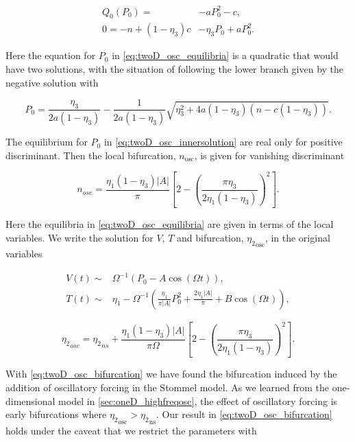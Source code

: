 \begin{equation}\label{eq:twoD_osc_equilibria}
\begin{aligned}
Q_0(P_0)=&-aP_0^2-c,\\
0=-n+(1-\eta_3)c&-\eta_3 P_0+aP_0^2.
\end{aligned}
\end{equation}

Here the equation for $P_0$ in \eqref{eq:twoD_osc_equilibria} is a quadratic that would have two solutions, with the situation of following the lower branch given by the negative solution with

\begin{equation}\label{eq:twoD_osc_innersolution}
P_0=\frac{\eta_3}{2a(1-\eta_3)}- \frac{1}{2a(1-\eta_3)}\sqrt{\eta_3^2+4a(1-\eta_3)(n-c(1-\eta_3))}.
\end{equation}

The equilibrium for $P_0$ in \eqref{eq:twoD_osc_innersolution} are real only for positive discriminant. Then the local bifurcation, $n_{\text{osc}}$, is given for vanishing discriminant 

\begin{equation}\label{eq:twoD_osc_innerbif}
n_{osc} = \frac{\eta_1(1-\eta_3)|A|}{\pi}\left[2-\left(\frac{\pi\eta_3}{2\eta_1(1-\eta_3)}\right)^2\right].
\end{equation}

Here the equilibria in \eqref{eq:twoD_osc_equilibria} are given in terms of the local variables. We write the solution for $V$, $T$ and bifurcation, ${\eta_2}_{\text{osc}}$, in the original variables 

\begin{equation}\label{eq:twoD_osc_innersolnoriginal}
\begin{aligned}
V(t)\sim& \Omega^{-1}\left(P_0-A\cos(\Omega t)\right),\\
T(t)\sim& \eta_1-\Omega^{-1}\left(\frac{\eta_1}{\pi|A|}P_0^2+\frac{2\eta_1|A|}{\pi}+B\cos(\Omega t)\right),
\end{aligned}
\end{equation}

\begin{equation}\label{eq:twoD_osc_bifurcation}
{\eta_2}_{osc} = {\eta_2}_{ns}+\frac{\eta_1(1-\eta_3)|A|}{\pi\Omega}\left[2-\left(\frac{\pi\eta_3}{2\eta_1(1-\eta_3)}\right)^2\right].
\end{equation}

With \eqref{eq:twoD_osc_bifurcation} we have found the bifurcation induced by the addition of oscillatory forcing in the Stommel model. As we learned from the one-dimensional model in \autoref{sec:oneD_highfreqosc}, the effect of oscillatory forcing is early bifurcations where ${\eta_2}_{\text{osc}}>{\eta_2}_{\text{ns}}$. Our result in \eqref{eq:twoD_osc_bifurcation} holds under the caveat that we restrict the parameters with 

